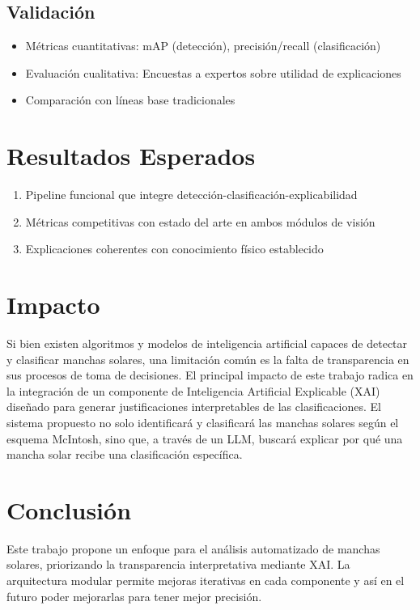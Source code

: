 \documentclass[conference]{IEEEtran}
\begin{document}


\subsection*{Validación}
\begin{itemize}
    \item Métricas cuantitativas: mAP (detección), precisión/recall (clasificación)
    \item Evaluación cualitativa: Encuestas a expertos sobre utilidad de explicaciones
    \item Comparación con líneas base tradicionales
\end{itemize}

\section*{Resultados Esperados}
\begin{enumerate}
    \item Pipeline funcional que integre detección-clasificación-explicabilidad
    \item Métricas competitivas con estado del arte en ambos módulos de visión
    \item Explicaciones coherentes con conocimiento físico establecido
\end{enumerate}


\section*{Impacto}

Si bien existen algoritmos y modelos de inteligencia artificial capaces de detectar y clasificar manchas solares, una limitación común es la falta de transparencia en sus procesos de toma de decisiones. El principal impacto de este trabajo radica en la integración de un componente de Inteligencia Artificial Explicable (XAI) diseñado para generar justificaciones interpretables de las clasificaciones.
El sistema propuesto no solo identificará y clasificará las manchas solares según el esquema McIntosh, sino que, a través de un LLM, buscará explicar por qué una mancha solar recibe una clasificación específica.

\section*{Conclusión}
Este trabajo propone un enfoque para el análisis automatizado de manchas solares, priorizando la transparencia interpretativa mediante XAI. La arquitectura modular permite mejoras iterativas en cada componente y así en el futuro poder mejorarlas para tener mejor precisión.
\end{document}
